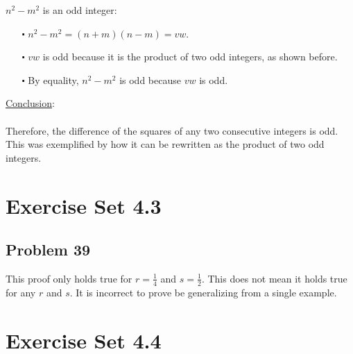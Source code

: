 \documentclass[12pt]{article}
\begin{document}
\newblock
$n^2 - m^2$ is an odd integer:
\begin{itemize}
  \item [$\centerdot$] $n^2 - m^2 = (n+m)(n-m) = vw$.
  \item [$\centerdot$] $vw$ is odd because it is the product of two odd integers, as shown before.
  \item [$\centerdot$] By equality, $n^2 - m^2$ is odd because $vw$ is odd.
\end{itemize}
\underline{Conclusion}:
\\ \\
Therefore, the difference of the squares of any two consecutive integers is odd. 
This was exemplified by how it can be rewritten as the product of two odd integers.
\section*{Exercise Set 4.3}
\subsection*{Problem 39}
This proof only holds true for $r= \frac{1}{4}$ and $s=\frac{1}{2}$. 
This does not mean it holds true for any $r$ and $s$. 
It is incorrect to prove be generalizing from a single example.
\section*{Exercise Set 4.4}
\end{document}
